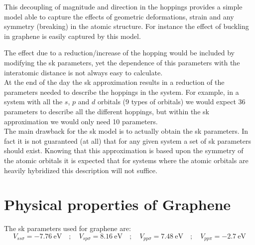 This decoupling of magnitude and direction in the hoppings provides a simple model able to capture the effects of geometric deformations, strain and any symmetry (breaking) in the atomic structure. For instance the effect of buckling in graphene is easily captured by this model.

The effect due to a reduction/increase of the hopping would be included by modifying the \ac{sk} parameters, yet the dependence of this parameters with the interatomic distance is not always easy to calculate.\\

At the end of the day the \ac{sk} approximation results in a reduction of the parameters needed to describe the hoppings in the system. For example, in a system with all the $s$, $p$ and $d$ orbitals (9 types of orbitals) we would expect 36 parameters to describe all the different hoppings, but within the \ac{sk} approximation we would only need 10 parameters.\\


The main drawback for the \ac{sk} model is to actually obtain the \ac{sk} parameters. In fact it is not guaranteed (at all) that for any given system a set of \ac{sk} parameters should exist.
Knowing that this approximation is based upon the symmetry of the atomic orbitals it is expected that for systems where the atomic orbitals are heavily hybridized this description will not suffice.




\section{Physical properties of Graphene}
The \ac{sk} parameters used for graphene are:
\begin{equation}
  V_{ss\sigma}= \SI{-7.76}{\eV} \quad;\quad
  V_{sp\sigma}= \SI{8.16}{\eV} \quad;\quad
  V_{pp\sigma}= \SI{7.48}{\eV} \quad;\quad
  V_{pp\pi}= \SI{-2.7}{\eV}
\label{sk_params}
\end{equation}

